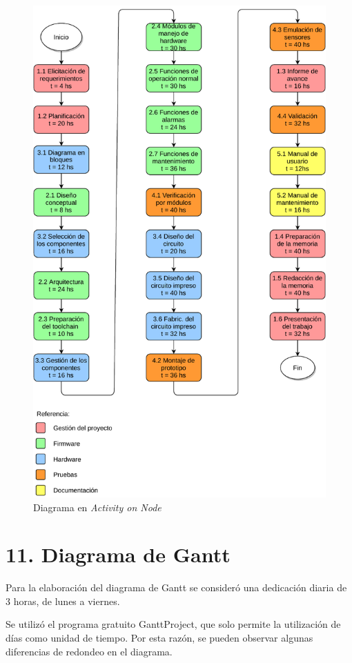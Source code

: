 \documentclass[
11pt, %
codirector, %
]{charter}
\begin{document}
\begin{figure}[htpb]
\centering 
\includegraphics[width=.9\textwidth]{./Figuras/SMTB_AoN.pdf}
\caption{Diagrama en \textit{Activity on Node}}
\label{fig:AoN}
\end{figure}

\section{11. Diagrama de Gantt}
\label{sec:gantt}

Para la elaboración del diagrama de Gantt se consideró una dedicación diaria de 3 horas, de lunes a viernes.

Se utilizó el programa gratuito GanttProject, que solo permite la utilización de días como unidad de tiempo. Por esta razón, se pueden observar algunas diferencias de redondeo en el diagrama.
\end{document}
